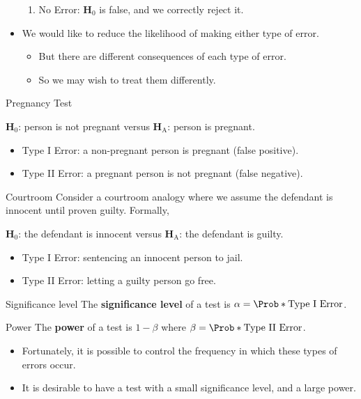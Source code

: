 \begin{itemize}
\begin{enumerate}[(1)]
                  \item No Error: $ \mathbf{H}_0 $ is false, and we correctly reject it.
            \end{enumerate}
      \item We would like to reduce the likelihood of making either type of error.
            \begin{itemize}
                  \item But there are different consequences of each type of error.
                  \item So we may wish to treat them differently.
            \end{itemize}
\end{itemize}
\begin{Example}{Pregnancy Test}{}
      \begin{tightcenter}
            $ \mathbf{H}_0 $: person is not pregnant versus $ \mathbf{H}_\text{A} $: person is pregnant.
      \end{tightcenter}
      \begin{itemize}
            \item Type I Error: a non-pregnant person is pregnant (false positive).
            \item Type II Error: a pregnant person is not pregnant (false negative).
      \end{itemize}
\end{Example}
\begin{Example}{Courtroom}{}
      Consider a courtroom analogy where we assume the defendant is innocent until proven guilty. Formally,
      \begin{tightcenter}
            $ \mathbf{H}_0 $: the defendant is innocent versus $ \mathbf{H}_\text{A} $: the defendant is guilty.
      \end{tightcenter}
      \begin{itemize}
            \item Type I Error: sentencing an innocent person to jail.
            \item Type II Error: letting a guilty person go free.
      \end{itemize}
\end{Example}
\begin{Definition}{Significance level}{}
      The \textbf{significance level} of a test is $ \alpha=\Prob*{\text{Type I Error}} $.
\end{Definition}
\begin{Definition}{Power}{}
      The \textbf{power} of a test is $ 1-\beta $ where
      $ \beta=\Prob*{\text{Type II Error}} $.
\end{Definition}
\begin{itemize}
      \item Fortunately, it is possible to control the frequency in which these types of errors
            occur.
      \item It is desirable to have a test with a small significance level, and a large power.
\end{itemize}
